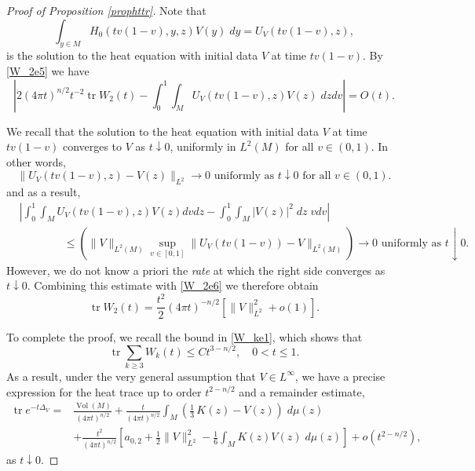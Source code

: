 \documentclass[letterpaper,12pt]{amsart}
\def \eref{\eqref}
\newcommand{\tr}{\mathop{\mathrm{tr}}}
\newcommand{\Vol}{\operatorname{Vol}}
\begin{document}
\begin{proof}[Proof of Proposition \ref{prophttr}]
Note that
$$ \int_{y \in M} H_0 (tv(1-v), y, z) V(y) \;dy = U_V (tv(1-v), z),$$
is the solution to the heat equation with initial data $V$ at time $tv(1-v)$.  By \eref{W_2e5} we have
\begin{equation} \label{W_2e6}
\left|  2 (4\pi t)^{n/2} t^{-2} \tr W_2 (t) - \int_0 ^1 \int_M  U_V (tv(1-v), z) V(z) \; dz dv \right| = O(t).
\end{equation}

We recall that the solution to the heat equation with initial data $V$ at time $tv(1-v)$
converges to $V$ as $t\downarrow 0$, uniformly in $L^2 (M)$ for all $v \in (0,1)$. In other words,
$$\| U_V (tv(1-v), z) - V(z)\|_{L^2} \to 0 \textrm{ uniformly as $t\downarrow 0$ for all $v\in (0,1)$.}$$
and as a result,
\begin{equation*}
\begin{split}
&\left| \int_0 ^1  \int_M U_V (tv(1-v), z) V(z) dv dz - \int_{0} ^1 \int_{M}   |V(z)|^2 \;dz \; vdv \right|  \\
& \qquad \qquad \leq \left( \|V\|_{L^2(M)} \sup_{v \in [0,1]} \| U_V (tv(1-v)) - V\|_{L^2 (M)}  \right) \to 0 \textrm{ uniformly as } t \downarrow 0.
\end{split}
\end{equation*}
However, we do not know a priori the {\it  rate} at which the right side converges as $t \downarrow 0$. Combining this estimate with \eref{W_2e6} we therefore obtain
\begin{equation} \label{W_2e1}
\tr W_2 (t) = \frac{t^2}{2}  (4\pi t)^{-n/2} \left[ \|V\|_{L^2} ^2  + o(1) \right].
\end{equation}

To complete the proof, we recall the bound in  \eref{W_ke1}, which shows that
\begin{equation} \label{eqn-trwk} \tr \sum_{k\geq 3} W_k (t) \leq C t^{3-n/2}, \quad 0<t\leq 1. \end{equation}
As a result, under the very general assumption that $V \in L^\infty$, we have a precise expression for the heat trace up to order $t^{2-n/2}$ and a remainder estimate,
\begin{equation*}
\begin{split}
\tr e^{-t \Delta_V} = & \frac{\Vol (M)}{(4\pi t)^{n/2}} + \frac{t}{(4\pi t)^{n/2}} \int_M \left( \frac 13 \, K(z)   - V(z)  \right) \;d\mu (z) \\
&   + \frac{t^2}{(4\pi t)^{n/2}}  \left[ a_{0,2} + \frac{1}{2} \|V\|_{L^2} ^2 - \frac{1}{6} \int_M  K(z) V(z)  \;d\mu (z)  \right] + o(t^{2-n/2}),
\end{split}
\end{equation*}
as $t \downarrow 0.$
\end{proof}
\end{document}
